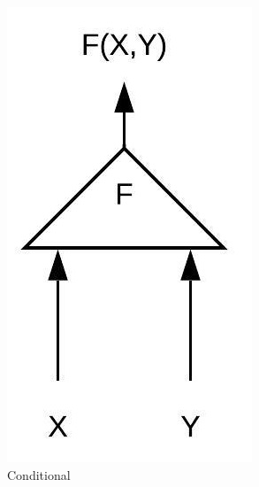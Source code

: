 \begin{figure}[htb]
    \centering
    \begin{subfigure}[b]{0.25\textwidth}
        \includegraphics[width=\textwidth]{lectures/07-b/images/1-2.jpeg}
        \caption{Conditional}
        \label{fig:conditional}
    \end{subfigure}
    \begin{subfigure}[b]{0.27\textwidth}

\end{subfigure}
\end{figure}
